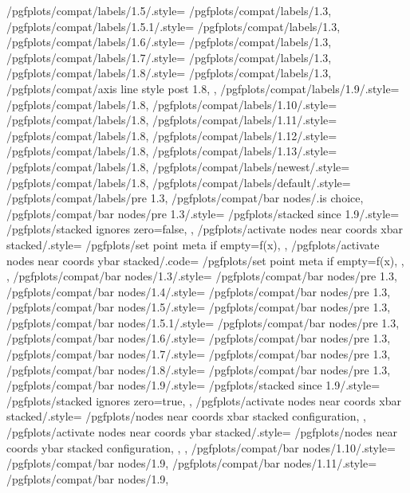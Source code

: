{	/pgfplots/compat/labels/1.5/.style=		{/pgfplots/compat/labels/1.3},%
	/pgfplots/compat/labels/1.5.1/.style=	{/pgfplots/compat/labels/1.3},%
	/pgfplots/compat/labels/1.6/.style=		{/pgfplots/compat/labels/1.3},%
	/pgfplots/compat/labels/1.7/.style=		{/pgfplots/compat/labels/1.3},%
	/pgfplots/compat/labels/1.8/.style=		{
		/pgfplots/compat/labels/1.3,
		/pgfplots/compat/axis line style post 1.8,
	},%
	/pgfplots/compat/labels/1.9/.style=		{/pgfplots/compat/labels/1.8},%
	/pgfplots/compat/labels/1.10/.style=		{/pgfplots/compat/labels/1.8},%
	/pgfplots/compat/labels/1.11/.style=		{/pgfplots/compat/labels/1.8},%
	/pgfplots/compat/labels/1.12/.style=		{/pgfplots/compat/labels/1.8},%
	/pgfplots/compat/labels/1.13/.style=		{/pgfplots/compat/labels/1.8},%
	/pgfplots/compat/labels/newest/.style=	{/pgfplots/compat/labels/1.8},%
	/pgfplots/compat/labels/default/.style=	{/pgfplots/compat/labels/pre 1.3},%
	/pgfplots/compat/bar nodes/.is choice,
	/pgfplots/compat/bar nodes/pre 1.3/.style={%
		/pgfplots/stacked since 1.9/.style={
			/pgfplots/stacked ignores zero=false,%
		},%
		/pgfplots/activate nodes near coords xbar stacked/.style={%
			/pgfplots/set point meta if empty=f(x),%
		},%
		/pgfplots/activate nodes near coords ybar stacked/.code={%
			/pgfplots/set point meta if empty=f(x),%
		},%
	},%
	/pgfplots/compat/bar nodes/1.3/.style=		{/pgfplots/compat/bar nodes/pre 1.3},%
	/pgfplots/compat/bar nodes/1.4/.style=		{/pgfplots/compat/bar nodes/pre 1.3},%
	/pgfplots/compat/bar nodes/1.5/.style=		{/pgfplots/compat/bar nodes/pre 1.3},%
	/pgfplots/compat/bar nodes/1.5.1/.style=	{/pgfplots/compat/bar nodes/pre 1.3},%
	/pgfplots/compat/bar nodes/1.6/.style=		{/pgfplots/compat/bar nodes/pre 1.3},%
	/pgfplots/compat/bar nodes/1.7/.style=		{/pgfplots/compat/bar nodes/pre 1.3},%
	/pgfplots/compat/bar nodes/1.8/.style=		{/pgfplots/compat/bar nodes/pre 1.3},%
	/pgfplots/compat/bar nodes/1.9/.style=		{
		/pgfplots/stacked since 1.9/.style={
			/pgfplots/stacked ignores zero=true,%
		},
		/pgfplots/activate nodes near coords xbar stacked/.style={
			/pgfplots/nodes near coords xbar stacked configuration,
		},
		/pgfplots/activate nodes near coords ybar stacked/.style={
			/pgfplots/nodes near coords ybar stacked configuration,
		},
	},%
	/pgfplots/compat/bar nodes/1.10/.style=		{/pgfplots/compat/bar nodes/1.9},%
	/pgfplots/compat/bar nodes/1.11/.style=		{/pgfplots/compat/bar nodes/1.9},%
}
